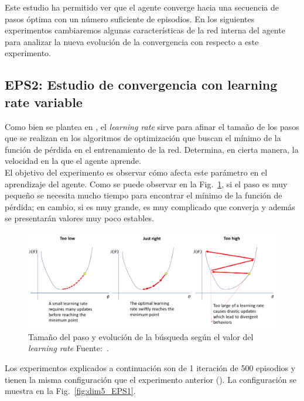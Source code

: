 Este estudio ha permitido ver que el agente converge hacia una secuencia de pasos óptima con un número suficiente de episodios. En los siguientes experimentos cambiaremos algunas características de la red interna del agente para analizar la nueva evolución de la convergencia con respecto a este experimento.


\subsection{EPS2: Estudio de convergencia con learning rate variable} \label{EPS2}

Como bien se plantea en \cite{learningRate}, el \textit{learning rate} sirve para afinar el tamaño de los pasos que se realizan en los algoritmos de optimización que buscan el mínimo de la función de pérdida en el entrenamiento de la red. Determina, en cierta manera, la velocidad en la que el agente aprende. \\

El objetivo del experimento es observar cómo afecta este parámetro en el aprendizaje del agente. Como se puede observar en la Fig.~\ref{fig:learningRate}, si el paso es muy pequeño se necesita mucho tiempo para encontrar el mínimo de la función de pérdida; en cambio, si es muy grande, es muy complicado que converja y además se presentarán valores muy poco estables. \\

\begin{figure}
    \centering
    \includegraphics[scale=0.3]{cap5_experimentacion/images/learningRate.png}
    \caption{Tamaño del paso y evolución de la búsqueda según el valor del \textit{learning rate} Fuente:~\cite{learningRateImage}.}
    \label{fig:learningRate}
\end{figure}

Los experimentos explicados a continuación son de 1 iteración de 500 episodios y tienen la misma configuración que el experimento anterior (). La configuración se muestra en la  Fig.~\ref{fig:dim5_EPS1}. \\

